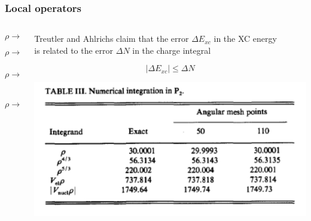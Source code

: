 \begin{frame}
    \frametitle{Local operators}
    \begin{columns}
    \begin{column}{0.3\linewidth}
    \normalsize
    \centering
    \begin{equation}
        \nonumber
        \rho \longrightarrow \nabla \rho
    \end{equation}
    
    \vspace{3mm}

    \begin{equation}
        \nonumber
        \rho \longrightarrow E_{xc}
    \end{equation}
    
    \vspace{2mm}

    \begin{equation}
        \nonumber
        \rho \longrightarrow \frac{\delta E_{xc}}{\delta \rho}
    \end{equation}
    
    \vspace{1mm}

    \begin{equation}
        \nonumber
        \rho \longrightarrow \frac{\delta^2 E_{xc}}{\delta \rho^2}
    \end{equation}
    
    \vspace{5mm}

    \end{column}
    \begin{column}{0.7\linewidth}
    \centering

    Treutler and Ahlrichs claim that the error $\Delta E_{xc}$ in the XC 
    energy\\ is related to the error $\Delta N$ in the charge integral

    \vspace{3mm}

    \begin{equation}
        \nonumber
        |\Delta E_{xc}| \leq\Delta N
    \end{equation}

    \vspace{5mm}

    \includegraphics[scale = 0.4]{figures/beckeAccuracy.pdf}


\end{column}
\end{columns}
\end{frame}
